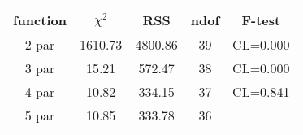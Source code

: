 \begin{tabular}{c|c|c|c|c}
function & $\chi^2$ & RSS & ndof & F-test \\
\hline
2 par & 1610.73 & 4800.86 & 39 & CL=0.000 \\
3 par & 15.21 & 572.47 & 38 & CL=0.000 \\
4 par & 10.82 & 334.15 & 37 & CL=0.841 \\
5 par & 10.85 & 333.78 & 36 & \\
\hline
\end{tabular}